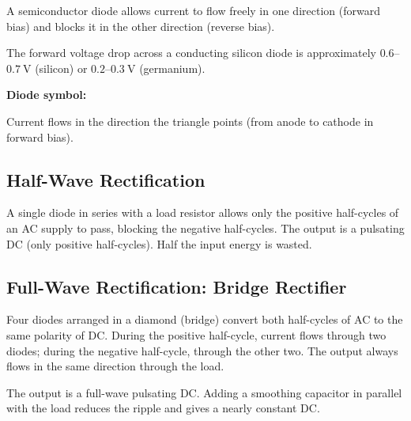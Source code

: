 \begin{definitionbox}
A semiconductor diode allows current to flow freely
in one direction (forward bias) and blocks it in
the other direction (reverse bias).

The forward voltage drop across a conducting silicon
diode is approximately $0.6$--$0.7\ \text{V}$ (silicon)
or $0.2$--$0.3\ \text{V}$ (germanium).

\textbf{Diode symbol:}
\begin{center}
\end{center}
Current flows in the direction the triangle points
(from anode to cathode in forward bias).
\end{definitionbox}

\subsection{Half-Wave Rectification}

\begin{processbox}
A single diode in series with a load resistor allows
only the positive half-cycles of an AC supply to pass,
blocking the negative half-cycles. The output is a
pulsating DC (only positive half-cycles). Half the
input energy is wasted.
\end{processbox}

\subsection{Full-Wave Rectification: Bridge Rectifier}

\begin{processbox}
Four diodes arranged in a diamond (bridge) convert
both half-cycles of AC to the same polarity of DC.
During the positive half-cycle, current flows through
two diodes; during the negative half-cycle, through
the other two. The output always flows in the same
direction through the load.

The output is a full-wave pulsating DC. Adding a
smoothing capacitor in parallel with the load
reduces the ripple and gives a nearly constant DC.
\end{processbox}

